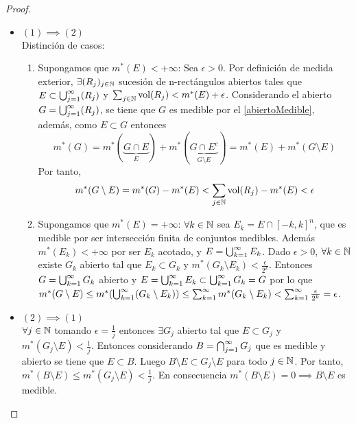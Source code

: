 \begin{proof}
    \leavevmode
    \begin{itemize}
        \item $(1) \implies (2)$\\
              Distinción de casos:
              \begin{enumerate}
                  \item Supongamos que $m^*(E) < +\infty$: Sea $\epsilon > 0$. Por definición de medida
                        exterior, $\exists (R_j)_{j \in \mathbb{N}}$ sucesión de n-rectángulos abiertos tales
                        que $E \subset \bigcup_{j=1}^{\infty}(R_j)$ y $\sum_{j \in \mathbb{N}} \text{vol}(R_j) < m^*(E) +
                            \epsilon$. Considerando el abierto $G = \bigcup_{j=1}^{\infty}(R_j)$, se tiene que $G$ es medible
                        por el \cref{abiertoMedible}, además, como $E \subset G$ entonces $$m^*(G) =
                            m^*(\underbrace{G \cap E}_{E}) + m^*(\underbrace{G \cap E^c}_{G \setminus E}) =
                            m^*(E) + m^*(G \setminus E)$$ Por tanto, $$m^*(G \setminus E) = m^*(G) - m^*(E)
                            < \sum_{j \in \mathbb{N}} \text{vol}(R_j) - m^*(E) < \epsilon$$
                  \item Supongamos que $m^*(E) = +\infty$: $\forall k \in \mathbb{N}$ sea $E_k = E \cap
                            [-k,k]^n$, que es medible por ser intersección finita de conjuntos medibles.
                        Además $m^*(E_k) < +\infty$ por ser $E_k$ acotado, y $E = \bigcup_{k=1}^{\infty}{E_k}$. Dado
                        $\epsilon > 0$, $\forall k \in \mathbb{N}$ existe $G_k$ abierto tal que $E_k \subset
                            G_k$ y $m^*(G_k \setminus E_k) < \frac{\epsilon}{2^k}$. Entonces $G =
                            \bigcup_{k=1}^{\infty}{G_k}$ abierto y $E = \bigcup_{k=1}^{\infty}{E_k} \subset \bigcup_{k=1}^{\infty}{G_k} = G$ por lo que $m^*(G
                            \setminus E) \leq m^*(\bigcup_{k=1}^{\infty}(G_k \setminus E_k)) \leq \sum_{k=1}^{\infty}{m^*(G_k \setminus E_k)}
                            < \sum_{k=1}^{\infty}{\frac{\epsilon}{2^k}} = \epsilon$.
              \end{enumerate}
        \item $(2) \implies (1)$\\
              $\forall j \in \mathbb{N}$ tomando $\epsilon = \frac{1}{j}$ entonces $\exists G_j$ abierto tal que $E \subset G_j$ y $m^*(G_j \setminus E) < \frac{1}{j}$. Entonces considerando $B = \bigcap_{j=1}^{\infty}{G_j}$ que es medible y abierto se tiene que $E \subset B$. Luego $B \setminus E \subset G_j \setminus E$ para todo $j \in \mathbb{N}$. Por tanto, $m^*(B \setminus E) \leq m^*(G_j \setminus E) < \frac{1}{j}$. En consecuencia $m^*(B \setminus E) = 0 \implies B \setminus E$ es medible.\\

\end{itemize}
\end{proof}
